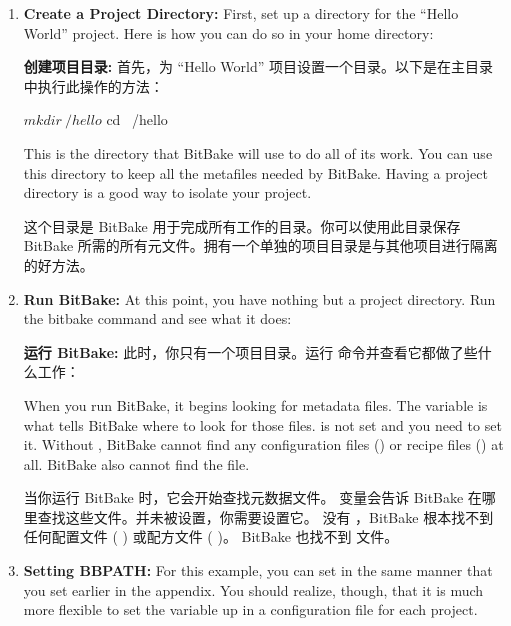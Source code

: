\begin{enumerate}
\setlength\itemsep{1.0em}
\item \textbf{Create a Project Directory:} First, set up a directory for the “Hello World” project. Here is how you can do so in your home directory:

\medskip
\textbf{创建项目目录:} 首先，为 ``Hello World'' 项目设置一个目录。以下是在主目录中执行此操作的方法：

\begin{pyglist}
$ mkdir ~/hello
$ cd ~/hello
\end{pyglist}

\medskip
This is the directory that BitBake will use to do all of its work. You can use this directory to keep all the metafiles needed by BitBake. Having a project directory is a good way to isolate your project.

\medskip
这个目录是 BitBake 用于完成所有工作的目录。你可以使用此目录保存 BitBake 所需的所有元文件。拥有一个单独的项目目录是与其他项目进行隔离的好方法。

\item \textbf{Run BitBake:} At this point, you have nothing but a project directory. Run the bitbake command and see what it does:

\medskip
\textbf{运行 BitBake:} 此时，你只有一个项目目录。运行  命令并查看它都做了些什么工作：

\medskip
{}

\medskip
When you run BitBake, it begins looking for metadata files. The  variable is what tells BitBake where to look for those files.  is not set and you need to set it. Without , BitBake cannot find any configuration files () or recipe files () at all. BitBake also cannot find the  file.

\medskip
当你运行 BitBake 时，它​​会开始查找元数据文件。  变量会告诉 BitBake 在哪里查找这些文件。并未被设置，你需要设置它。 没有 ，BitBake 根本找不到任何配置文件 ( ) 或配方文件 ( )。 BitBake 也找不到  文件。

\item \textbf{Setting BBPATH:} For this example, you can set  in the same manner that you set  earlier in the appendix. You should realize, though, that it is much more flexible to set the  variable up in a configuration file for each project.


\end{enumerate}
